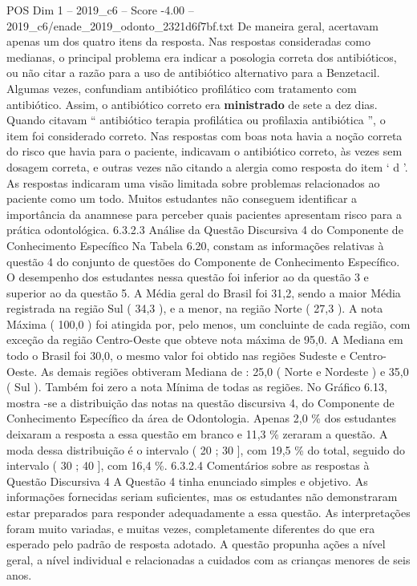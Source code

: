 \begin{textsample}{POS Dim 1 – 2019\_c6 – Score -4.00 – 2019\_c6/enade\_2019\_odonto\_2321d6f7bf.txt}
De maneira geral, acertavam apenas um dos quatro itens da resposta.
Nas respostas consideradas como medianas, o principal problema era indicar a posologia correta dos antibióticos, ou não citar a razão para a uso de antibiótico alternativo para a Benzetacil.
Algumas vezes, confundiam antibiótico profilático com tratamento com antibiótico.
Assim, o antibiótico correto era \textbf{ministrado} de sete a dez dias.
Quando citavam “ antibiótico terapia profilática ou profilaxia antibiótica ”, o item foi considerado correto.
Nas respostas com boas nota havia a noção correta do risco que havia para o paciente, indicavam o antibiótico correto, às vezes sem dosagem correta, e outras vezes não citando a alergia como resposta do item ‘ d ’.
As respostas indicaram uma visão limitada sobre problemas relacionados ao paciente como um todo.
Muitos estudantes não conseguem identificar a importância da anamnese para perceber quais pacientes apresentam risco para a prática odontológica. 6.3.2.3 Análise da Questão Discursiva 4 do Componente de Conhecimento Específico Na Tabela 6.20, constam as informações relativas à questão 4 do conjunto de questões do Componente de Conhecimento Específico.
O desempenho dos estudantes nessa questão foi inferior ao da questão 3 e superior ao da questão 5.
A Média geral do Brasil foi 31,2, sendo a maior Média registrada na região Sul ( 34,3 ), e a menor, na região Norte ( 27,3 ).
A nota Máxima ( 100,0 ) foi atingida por, pelo menos, um concluinte de cada região, com exceção da região Centro-Oeste que obteve nota máxima de 95,0.
A Mediana em todo o Brasil foi 30,0, o mesmo valor foi obtido nas regiões Sudeste e Centro-Oeste.
As demais regiões obtiveram Mediana de : 25,0 ( Norte e Nordeste ) e 35,0 ( Sul ).
Também foi zero a nota Mínima de todas as regiões.
No Gráfico 6.13, mostra -se a distribuição das notas na questão discursiva 4, do Componente de Conhecimento Específico da área de Odontologia.
Apenas 2,0 \% dos estudantes deixaram a resposta a essa questão em branco e 11,3 \% zeraram a questão.
A moda dessa distribuição é o intervalo ( 20 ; 30 ], com 19,5 \% do total, seguido do intervalo ( 30 ; 40 ], com 16,4 \%. 6.3.2.4 Comentários sobre as respostas à Questão Discursiva 4 A Questão 4 tinha enunciado simples e objetivo.
As informações fornecidas seriam suficientes, mas os estudantes não demonstraram estar preparados para responder adequadamente a essa questão.
As interpretações foram muito variadas, e muitas vezes, completamente diferentes do que era esperado pelo padrão de resposta adotado.
A questão propunha ações a nível geral, a nível individual e relacionadas a cuidados com as crianças menores de seis anos.

\end{textsample}

